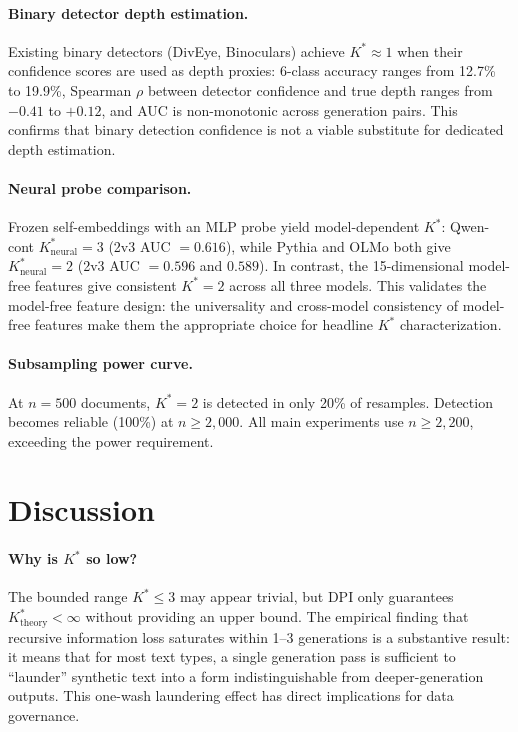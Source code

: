 \documentclass[11pt,a4paper]{article}
\begin{document}
\paragraph{Binary detector depth estimation.}\label{sec:binary_det}
Existing binary detectors (DivEye, Binoculars) achieve $K^*\!\approx\!1$ when their confidence scores are used as depth proxies: 6-class accuracy ranges from 12.7\% to 19.9\%, Spearman $\rho$ between detector confidence and true depth ranges from $-0.41$ to $+0.12$, and AUC is non-monotonic across generation pairs. This confirms that binary detection confidence is not a viable substitute for dedicated depth estimation.

\paragraph{Neural probe comparison.}\label{sec:neural_probe}
Frozen self-embeddings with an MLP probe yield model-dependent $K^*$: Qwen-cont $K^*_{\text{neural}}\!=\!3$ (2v3 AUC $= 0.616$), while Pythia and OLMo both give $K^*_{\text{neural}}\!=\!2$ (2v3 AUC $= 0.596$ and $0.589$). In contrast, the 15-dimensional model-free features give consistent $K^*\!=\!2$ across all three models. This validates the model-free feature design: the universality and cross-model consistency of model-free features make them the appropriate choice for headline $K^*$ characterization.

\paragraph{Subsampling power curve.}
At $n = 500$ documents, $K^*\!=\!2$ is detected in only 20\% of resamples. Detection becomes reliable (100\%) at $n \geq 2{,}000$. All main experiments use $n \geq 2{,}200$, exceeding the power requirement.


\section{Discussion}

\paragraph{Why is $K^*$ so low?}
The bounded range $K^*\!\leq\!3$ may appear trivial, but DPI only guarantees $K^*_{\text{theory}} < \infty$ without providing an upper bound. The empirical finding that recursive information loss saturates within 1--3 generations is a substantive result: it means that for most text types, a single generation pass is sufficient to ``launder'' synthetic text into a form indistinguishable from deeper-generation outputs. This one-wash laundering effect has direct implications for data governance.
\end{document}
